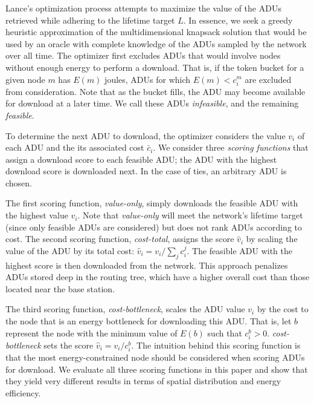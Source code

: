 Lance's optimization process attempts to maximize the value of the ADUs
retrieved while adhering to the lifetime target $L$. In essence, we seek a
greedy heuristic approximation of the multidimensional knapsack solution that
would be used by an oracle with complete knowledge of the ADUs sampled by the
network over all time. The optimizer first excludes ADUs that would involve
nodes without enough energy to perform a download. That is, if the token
bucket for a given node $m$ has $E(m)$ joules, ADUs for which $E(m) < c_i^m$
are excluded from consideration. Note that as the bucket fills, the ADU may
become available for download at a later time. We call these ADUs
\textit{infeasible}, and the remaining \textit{feasible}.

To determine the next ADU to download, the optimizer considers the value
$v_i$ of each ADU and the its associated cost $\bar{c}_i$. We consider three
\textit{scoring functions} that assign a download score to each feasible ADU;
the ADU with the highest download score is downloaded next. In the case of
ties, an arbitrary ADU is chosen.

The first scoring function, \textit{value-only}, simply downloads the
feasible ADU with the highest value $v_i$. Note that \textit{value-only} will
meet the network's lifetime target (since only feasible ADUs are considered)
but does not rank ADUs according to cost. The second scoring function,
\textit{cost-total}, assigns the score $\hat{v}_i$ by scaling the value of
the ADU by its total cost: $\hat{v}_i = v_i / \sum_j c_i^j$. The feasible ADU
with the highest score is then downloaded from the network. This approach
penalizes ADUs stored deep in the routing tree, which have a higher overall
cost than those located near the base station. 

The third scoring function, \textit{cost-bottleneck}, scales the ADU value
$v_i$ by the cost to the node that is an energy bottleneck for downloading
this ADU. That is, let $b$ represent the node with the minimum value of
$E(b)$ such that $c_i^b > 0$. \textit{cost-bottleneck} sets the score
$\hat{v}_i = v_i / c_i^b$. The intuition behind this scoring function is that
the most energy-constrained node should be considered when scoring ADUs for
download. We evaluate all three scoring functions in this paper and show that
they yield very different results in terms of spatial distribution and energy
efficiency.
